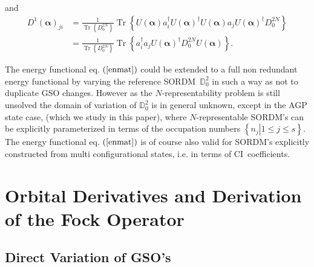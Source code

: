 \documentclass[aps,preprint]{revtex4}%
\begin{document}
and
\begin{align}
D^{1}\left(  \mathbf{\alpha}\right)  _{ji}  &  =\frac{1}{\operatorname{Tr}%
\left\{  D_{0}^{2N}\right\}  }\operatorname{Tr}\left\{  U\left(
\mathbf{\alpha}\right)  a_{i}^{\dagger}U\left(  \mathbf{\alpha}\right)
^{\dagger}U\left(  \mathbf{\alpha}\right)  a_{j}U\left(  \mathbf{\alpha
}\right)  ^{\dagger}D_{0}^{2N}\right\} \nonumber\\
&  =\frac{1}{\operatorname{Tr}\left\{  D_{0}^{2N}\right\}  }\operatorname{Tr}%
\left\{  a_{i}^{\dagger}a_{j}U\left(  \mathbf{\alpha}\right)  ^{\dagger}%
D_{0}^{2N}U\left(  \mathbf{\alpha}\right)  \right\}  .
\end{align}


The energy functional eq. $\left(  \ref{enmat}\right)  $ could be extended to
a full non redundant energy functional by varying the reference
SORDM\ $\mathbb{D}_{0}^{2}$ in such a way as not to duplicate GSO changes.
However as the $N$-representability problem is still unsolved the domain of
variation of $\mathbb{D}_{0}^{2}$ is in general unknown, except in the AGP
state case, (which we study in this paper), where $N$-representable SORDM's
can be explicitly parameterized in terms of the occupation numbers $\left\{
\left.  n_{j}\right\vert 1\leq j\leq s\right\}  $. The energy functional eq.
$\left(  \ref{enmat}\right)  $ is of course also valid for SORDM's explicitly
constructed from multi configurational states, i.e. in terms of CI\ coefficients.

\section{Orbital Derivatives and Derivation of the Fock
Operator\label{Deriv_Fock}}

\subsection{Direct Variation of GSO's}
\end{document}
